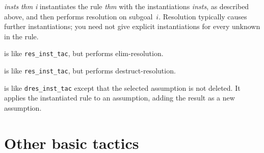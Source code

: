 \begin{ttdescription}
\item[\ttindexbold{res_inst_tac} {\it insts} {\it thm} {\it i}]
instantiates the rule {\it thm} with the instantiations {\it insts}, as
described above, and then performs resolution on subgoal~$i$.  Resolution
typically causes further instantiations; you need not give explicit
instantiations for every unknown in the rule.

\item[\ttindexbold{eres_inst_tac}] 
is like {\tt res_inst_tac}, but performs elim-resolution.

\item[\ttindexbold{dres_inst_tac}] 
is like {\tt res_inst_tac}, but performs destruct-resolution.

\item[\ttindexbold{forw_inst_tac}] 
is like {\tt dres_inst_tac} except that the selected assumption is not
deleted.  It applies the instantiated rule to an assumption, adding the
result as a new assumption.
\end{ttdescription}


\section{Other basic tactics}
